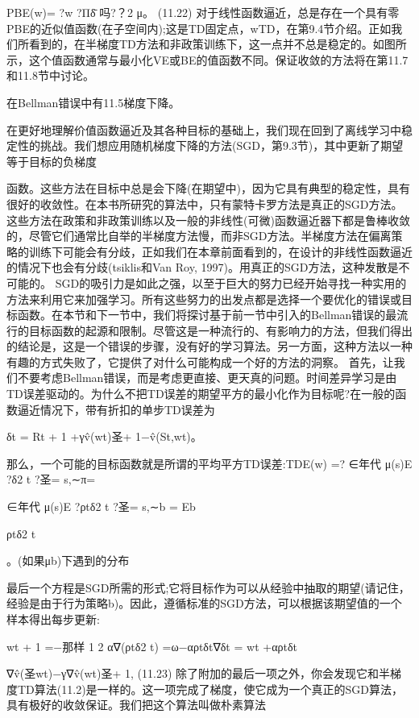PBE(w)= ?w ?Πδ̄
吗?？2
μ。 					(11.22)
对于线性函数逼近，总是存在一个具有零PBE的近似值函数(在子空间内);这是TD固定点，wTD，在第9.4节介绍。正如我们所看到的，在半梯度TD方法和非政策训练下，这一点并不总是稳定的。如图所示，这个值函数通常与最小化VE或BE的值函数不同。保证收敛的方法将在第11.7和11.8节中讨论。


在Bellman错误中有11.5梯度下降。

在更好地理解价值函数逼近及其各种目标的基础上，我们现在回到了离线学习中稳定性的挑战。我们想应用随机梯度下降的方法(SGD，第9.3节)，其中更新了期望等于目标的负梯度


函数。这些方法在目标中总是会下降(在期望中)，因为它具有典型的稳定性，具有很好的收敛性。在本书所研究的算法中，只有蒙特卡罗方法是真正的SGD方法。这些方法在政策和非政策训练以及一般的非线性(可微)函数逼近器下都是鲁棒收敛的，尽管它们通常比自举的半梯度方法慢，而非SGD方法。半梯度方法在偏离策略的训练下可能会有分歧，正如我们在本章前面看到的，在设计的非线性函数逼近的情况下也会有分歧(tsiklis和Van Roy, 1997)。用真正的SGD方法，这种发散是不可能的。
SGD的吸引力是如此之强，以至于巨大的努力已经开始寻找一种实用的方法来利用它来加强学习。所有这些努力的出发点都是选择一个要优化的错误或目标函数。在本节和下一节中，我们将探讨基于前一节中引入的Bellman错误的最流行的目标函数的起源和限制。尽管这是一种流行的、有影响力的方法，但我们得出的结论是，这是一个错误的步骤，没有好的学习算法。另一方面，这种方法以一种有趣的方式失败了，它提供了对什么可能构成一个好的方法的洞察。
首先，让我们不要考虑Bellman错误，而是考虑更直接、更天真的问题。时间差异学习是由TD误差驱动的。为什么不把TD误差的期望平方的最小化作为目标呢?在一般的函数逼近情况下，带有折扣的单步TD误差为

δt = Rt + 1 +γv̂(wt)圣+ 1−v̂(St,wt)。

那么，一个可能的目标函数就是所谓的平均平方TD误差:TDE(w) =?
∈年代
μ(s)E ?δ2 t ?圣= s,∼π=

∈年代
μ(s)E ?ρtδ2 t ?圣= s,∼b = Eb

ρtδ2 t

。(如果μb)下遇到的分布

最后一个方程是SGD所需的形式;它将目标作为可以从经验中抽取的期望(请记住，经验是由于行为策略b)。因此，遵循标准的SGD方法，可以根据该期望值的一个样本得出每步更新:


wt + 1 =−那样
1 2
α∇(ρtδ2 t)
=ω−αρtδt∇δt = wt +αρtδt

∇v̂(圣wt)−γ∇v̂(wt)圣+ 1, 					(11.23)
除了附加的最后一项之外，你会发现它和半梯度TD算法(11.2)是一样的。这一项完成了梯度，使它成为一个真正的SGD算法，具有极好的收敛保证。我们把这个算法叫做朴素算法

